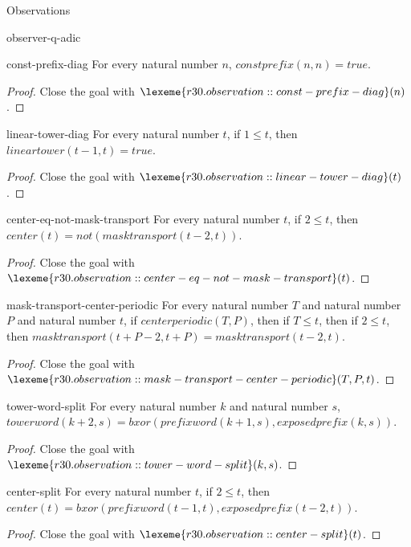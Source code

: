 \begin{lexlean}{Observations}
\begin{section}{observer-q-adic}
\begin{theorem}{const-prefix-diag}
For every natural number \(n\), \(constprefix(n, n) = true\).
\begin{proof}
Close the goal with \(\lexeme{r30.observation::const-prefix-diag}(n)\).
\end{proof}
\end{theorem}

\begin{theorem}{linear-tower-diag}
For every natural number \(t\), if \(1 ≤ t\), then \(lineartower(t - 1, t) = true\).
\begin{proof}
Close the goal with \(\lexeme{r30.observation::linear-tower-diag}(t)\).
\end{proof}
\end{theorem}

\begin{theorem}{center-eq-not-mask-transport}
For every natural number \(t\), if \(2 ≤ t\), then \(center(t) = not(masktransport(t - 2, t))\).
\begin{proof}
Close the goal with \(\lexeme{r30.observation::center-eq-not-mask-transport}(t)\).
\end{proof}
\end{theorem}

\begin{theorem}{mask-transport-center-periodic}
For every natural number \(T\) and natural number \(P\) and natural number \(t\), if \(centerperiodic(T, P)\), then if \(T ≤ t\), then if \(2 ≤ t\), then \(masktransport(t + P - 2, t + P) = masktransport(t - 2, t)\).
\begin{proof}
Close the goal with \(\lexeme{r30.observation::mask-transport-center-periodic}(T, P, t)\).
\end{proof}
\end{theorem}

\begin{theorem}{tower-word-split}
For every natural number \(k\) and natural number \(s\), \(towerword(k + 2, s) = bxor(prefixword(k + 1, s), exposedprefix(k, s))\).
\begin{proof}
Close the goal with \(\lexeme{r30.observation::tower-word-split}(k, s)\).
\end{proof}
\end{theorem}

\begin{theorem}{center-split}
For every natural number \(t\), if \(2 ≤ t\), then \(center(t) = bxor(prefixword(t - 1, t), exposedprefix(t - 2, t))\).
\begin{proof}
Close the goal with \(\lexeme{r30.observation::center-split}(t)\).
\end{proof}
\end{theorem}


\end{section}
\end{lexlean}
